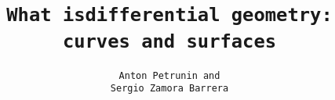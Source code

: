 \title{\tt What isdifferential geometry:\\
curves and surfaces}
\author{\tt Anton Petrunin and \\ \tt Sergio Zamora Barrera}
\date{}
\maketitle
\thispagestyle{empty}

